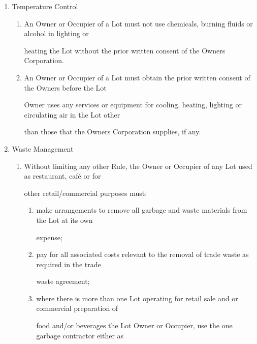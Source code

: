 \documentclass{article}
\begin{document}
\begin{enumerate}[label=\arabic*.]
\begin{enumerate}[label=\arabic{enumi}.\arabic*.]
\begin{enumerate}[label=(\arabic*)]
\end{enumerate}
\item {\fontsize{9.99}{1} Temperature Control }

\begin{enumerate}[label=(\arabic*)]
\item {\fontsize{9.962}{1} An Owner or Occupier of a Lot must not use chemicals, burning fluids or alcohol in lighting or }

{\fontsize{10.02}{1}heating the Lot without the prior written consent of the Owners Corporation. }

\item {\fontsize{9.962}{1} An Owner or Occupier of a Lot must obtain the prior written consent of the Owners before the Lot }

{\fontsize{10.02}{1}Owner uses any services or equipment for cooling, heating, lighting or circulating air in the Lot other }

{\fontsize{10.02}{1}than those that the Owners Corporation supplies, if any. }

\end{enumerate}
\item {\fontsize{9.99}{1} Waste Management }

\begin{enumerate}[label=(\arabic*)]
\item {\fontsize{9.962}{1} Without limiting any other Rule, the Owner or Occupier of any Lot used as restaurant, café or for }

{\fontsize{10.02}{1}other retail/commercial purposes must: }

\begin{enumerate}[label=(\alph*)]
\item {\fontsize{9.962}{1} make arrangements to remove all garbage and waste materials from the Lot at its own }

{\fontsize{10.02}{1}expense; }

\item {\fontsize{9.962}{1} pay for all associated costs relevant to the removal of trade waste as required in the trade }

{\fontsize{10.02}{1}waste agreement; }

\item {\fontsize{9.962}{1} where there is more than one Lot operating for retail sale and or commercial preparation of }

\newpage

{\fontsize{10.02}{1}food and/or beverages the Lot Owner or Occupier, use the one garbage contractor either as }


\end{enumerate}
\end{enumerate}
\end{enumerate}
\end{enumerate}
\end{document}
